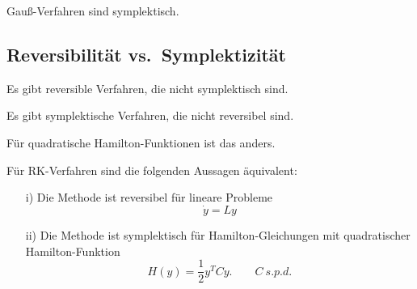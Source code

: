 \begin{kor}
	Gauß-Verfahren sind symplektisch.
\end{kor}

\subsection{Reversibilität vs.\ Symplektizität}

Es gibt reversible Verfahren, die nicht symplektisch sind.

\medskip

Es gibt symplektische Verfahren, die nicht reversibel sind.

\medskip

Für quadratische Hamilton-Funktionen ist das anders.

\begin{satz}
	Für RK-Verfahren sind die folgenden Aussagen äquivalent:
	\begin{itemize}
		\item [i)] Die Methode ist reversibel für lineare Probleme
		\begin{equation*}
			\dot y = Ly
		\end{equation*}
		\item [ii)] Die Methode ist symplektisch für Hamilton-Gleichungen mit quadratischer Hamilton-Funktion
		\begin{equation*}
			H(y) = \frac{1}{2} y^TCy.\qquad C\ s.p.d.
		\end{equation*}
	\end{itemize}
\end{satz}

